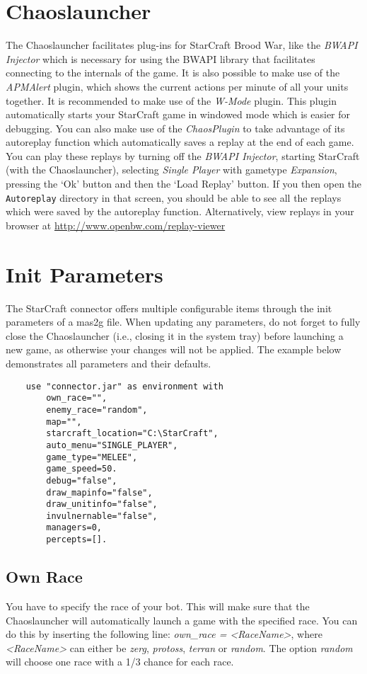\section{Chaoslauncher}
The Chaoslauncher facilitates plug-ins for StarCraft Brood War, like the \textit{BWAPI Injector} which is necessary for using the BWAPI library that facilitates connecting to the internals of the game. It is also possible to make use of the \textit{APMAlert} plugin, which shows the current actions per minute of all your units together. It is recommended to make use of the \textit{W-Mode} plugin. This plugin automatically starts your StarCraft game in windowed mode which is easier for debugging. You can also make use of the \textit{ChaosPlugin} to take advantage of its autoreplay function which automatically saves a replay at the end of each game. You can play these replays by turning off the \textit{BWAPI Injector}, starting StarCraft (with the Chaoslauncher), selecting \textit{Single Player} with gametype \textit{Expansion}, pressing the `Ok' button and then the `Load Replay' button. If you then open the \texttt{Autoreplay} directory in that screen, you should be able to see all the replays which were saved by the autoreplay function. Alternatively, view replays in your browser at \url{http://www.openbw.com/replay-viewer}

\section{Init Parameters}
\label{mas2g}
The StarCraft connector offers multiple configurable items through the init parameters of a mas2g file. When updating any parameters, do not forget to fully close the Chaoslauncher (i.e., closing it in the system tray) before launching a new game, as otherwise your changes will not be applied. The example below demonstrates all parameters and their defaults.

\begin{verbatim}
    use "connector.jar" as environment with
        own_race="",
        enemy_race="random",
        map="",
        starcraft_location="C:\StarCraft",
        auto_menu="SINGLE_PLAYER",
        game_type="MELEE",
        game_speed=50.
        debug="false",
        draw_mapinfo="false",
        draw_unitinfo="false",
        invulnernable="false",
        managers=0,
        percepts=[].
\end{verbatim}

\subsection{Own Race}
\label{own race}
You have to specify the race of your bot. This will make sure that the Chaoslauncher will automatically launch a game with the specified race. You can do this by inserting the following line: \textit{own\_race = <RaceName>}, where \textit{<RaceName>} can either be \textit{zerg}, \textit{protoss}, \textit{terran} or \textit{random}. The option \textit{random} will choose one race with a 1/3 chance for each race.


